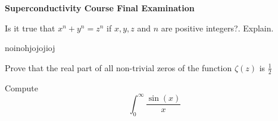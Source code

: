 \documentclass[answer]{exam}
\begin{document}
\begin{center}


 
\textbf{Superconductivity Course Final Examination } \\

\vspace{5mm}
\end{center}
\extraheadheight{-0.8in}
\vspace{5mm}


\begin{questions}
\question Is it true that \(x^n + y^n = z^n\) if \(x,y,z\) and \(n\) are
positive integers?. Explain.
\begin{solution}
    noinohjojojioj
\end{solution}

\question Prove that the real part of all non-trivial zeros of the function
\(\zeta(z)\) is \(\frac{1}{2}\)


\question Compute \[\int_{0}^{\infty} \frac{\sin(x)}{x}\]
\end{questions}
\end{document}
